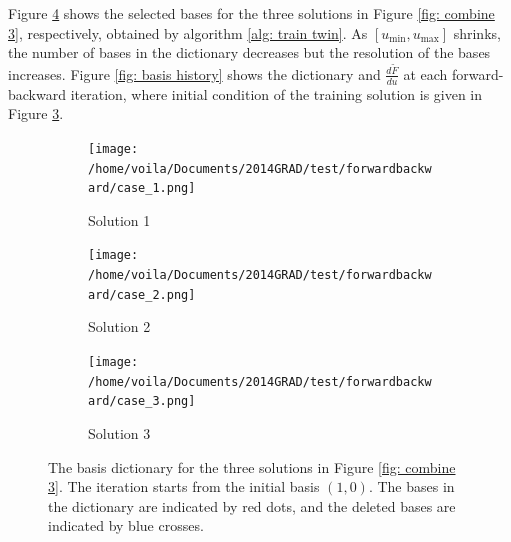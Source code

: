 Figure \ref{fig: basis pnt} shows the selected bases
for the three solutions in Figure \ref{fig: combine 3}, respectively, obtained by 
algorithm \ref{alg: train twin}.
As $\left[u_{\min}, u_{\max}\right]$ shrinks, the number of bases in the dictionary decreases
but the resolution of the bases increases. Figure \ref{fig: basis history} shows
the dictionary and $\frac{d\tilde{F}}{du}$ 
at each forward-backward iteration, where initial condition of the training solution 
is given in Figure \ref{fig: basis pnt 3}.\\

\begin{figure}[htbp]\begin{center}
    \begin{subfigure}[t]{.32\textwidth}
        \centering
        \texttt{[image: /home/voila/Documents/2014GRAD/test/forwardbackward/case\_1.png]}
        \caption{Solution 1}
        \label{fig: basis pnt 1}
    \end{subfigure}
    \begin{subfigure}[t]{.32\textwidth}     
        \centering
        \texttt{[image: /home/voila/Documents/2014GRAD/test/forwardbackward/case\_2.png]}
        \caption{Solution 2}
        \label{fig: basis pnt 2}
    \end{subfigure}
    \begin{subfigure}[t]{.32\textwidth}
        \centering
        \texttt{[image: /home/voila/Documents/2014GRAD/test/forwardbackward/case\_3.png]}
        \caption{Solution 3}
        \label{fig: basis pnt 3}
    \end{subfigure}
    \caption{The basis dictionary for the three solutions in Figure \ref{fig: combine 3}.
             The iteration starts from the initial basis $(1,0)$. The bases in the
             dictionary are indicated by red dots, and the deleted bases are indicated
             by blue crosses.}
    \label{fig: basis pnt}
\end{center}\end{figure}


